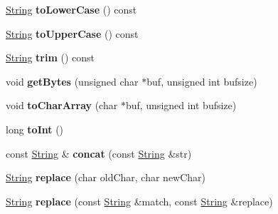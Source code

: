 \begin{DoxyCompactItemize}
\item 
\hypertarget{classString_a17f872d6422e11d2b9c3902f800dc19c}{
\hyperlink{classString}{\-String} {\bfseries to\-Lower\-Case} () const }
\label{classString_a17f872d6422e11d2b9c3902f800dc19c}

\item 
\hypertarget{classString_a1be059135eecd087baca2174ed403516}{
\hyperlink{classString}{\-String} {\bfseries to\-Upper\-Case} () const }
\label{classString_a1be059135eecd087baca2174ed403516}

\item 
\hypertarget{classString_ad3853992f01ae00f2e6ed2d4eda85fb6}{
\hyperlink{classString}{\-String} {\bfseries trim} () const }
\label{classString_ad3853992f01ae00f2e6ed2d4eda85fb6}

\item 
\hypertarget{classString_a87ed5d0774c614c9811b9d6e3e5d36d4}{
void {\bfseries get\-Bytes} (unsigned char $\ast$buf, unsigned int bufsize)}
\label{classString_a87ed5d0774c614c9811b9d6e3e5d36d4}

\item 
\hypertarget{classString_add11f6222fa98444c9af6baf9d0eb874}{
void {\bfseries to\-Char\-Array} (char $\ast$buf, unsigned int bufsize)}
\label{classString_add11f6222fa98444c9af6baf9d0eb874}

\item 
\hypertarget{classString_a77e821a32cc42cc7875331685bb5abd3}{
long {\bfseries to\-Int} ()}
\label{classString_a77e821a32cc42cc7875331685bb5abd3}

\item 
\hypertarget{classString_a458fe8623cb3447270e0c9e599bf8149}{
const \hyperlink{classString}{\-String} \& {\bfseries concat} (const \hyperlink{classString}{\-String} \&str)}
\label{classString_a458fe8623cb3447270e0c9e599bf8149}

\item 
\hypertarget{classString_aa3777be2f9b9dd6480a6ed23175005f5}{
\hyperlink{classString}{\-String} {\bfseries replace} (char old\-Char, char new\-Char)}
\label{classString_aa3777be2f9b9dd6480a6ed23175005f5}

\item 
\hypertarget{classString_a31420099ed8dbc81a36992b01f6c3e64}{
\hyperlink{classString}{\-String} {\bfseries replace} (const \hyperlink{classString}{\-String} \&match, const \hyperlink{classString}{\-String} \&replace)}
\label{classString_a31420099ed8dbc81a36992b01f6c3e64}

\end{DoxyCompactItemize}
